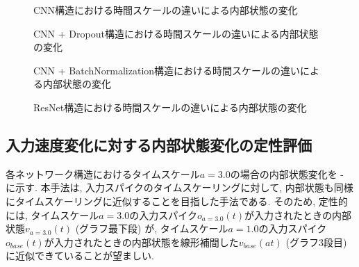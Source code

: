 \begin{figure}[htb]
    \centering
    
    \caption{CNN構造における時間スケールの違いによる内部状態の変化}
    \label{fig:result1:1:cnn}
\end{figure}

\begin{figure}[htb]
    \centering
    
    \caption{CNN + Dropout構造における時間スケールの違いによる内部状態の変化}
    \label{fig:result1:1:cnn:dropout}
\end{figure}

\begin{figure}[htb]
    \centering
    
    \caption{CNN + BatchNormalization構造における時間スケールの違いによる内部状態の変化}
    \label{fig:result1:1:cnn:batchnormalization}
\end{figure}

\begin{figure}[htb]
    \centering
    
    \caption{ResNet構造における時間スケールの違いによる内部状態の変化}
    \label{fig:result1:1:resnet}
\end{figure}
\clearpage


\subsection{入力速度変化に対する内部状態変化の定性評価}
各ネットワーク構造におけるタイムスケール$a=3.0$の場合の内部状態変化を - に示す.
本手法は, 入力スパイクのタイムスケーリングに対して, 内部状態も同様にタイムスケーリングに近似することを目指した手法である.
そのため, 定性的には, タイムスケール$a=3.0$の入力スパイク$o_{a=3.0}(t)$が入力されたときの内部状態$v_{a=3.0}(t)$ (グラフ最下段) が, タイムスケール$a=1.0$の入力スパイク$o_{base}(t)$が入力されたときの内部状態を線形補間した$v_{base}(at)$ (グラフ3段目) に近似できていることが望ましい.

